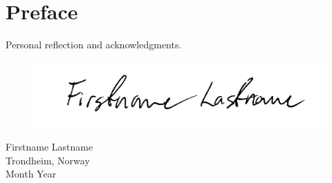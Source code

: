 \section*{Preface} %

Personal reflection and acknowledgments.

\vspace{.8cm}
\begin{figure}[h]
	\raggedleft
	\includegraphics[width=0.5\linewidth]{img/signature.pdf}
\end{figure}
\begin{flushright}
	\vspace{-0.8cm}
	Firstname Lastname \\
	Trondheim, Norway\\
	Month Year
\end{flushright}

\cleardoublepage